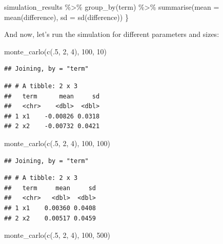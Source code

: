 \documentclass[
]{article}
\newenvironment{Shaded}{\begin{snugshade}}{\end{snugshade}}
\newcommand{\AttributeTok}[1]{\textcolor[rgb]{0.77,0.63,0.00}{#1}}
\newcommand{\DecValTok}[1]{\textcolor[rgb]{0.00,0.00,0.81}{#1}}
\newcommand{\FunctionTok}[1]{\textcolor[rgb]{0.00,0.00,0.00}{#1}}
\newcommand{\NormalTok}[1]{#1}
\newcommand{\SpecialCharTok}[1]{\textcolor[rgb]{0.00,0.00,0.00}{#1}}
\begin{document}
\begin{Shaded}
\begin{Highlighting}[]
\NormalTok{  simulation\_results }\SpecialCharTok{\%\textgreater{}\%} 
    \FunctionTok{group\_by}\NormalTok{(term) }\SpecialCharTok{\%\textgreater{}\%} 
    \FunctionTok{summarise}\NormalTok{(}\AttributeTok{mean =} \FunctionTok{mean}\NormalTok{(difference), }
              \AttributeTok{sd =} \FunctionTok{sd}\NormalTok{(difference))}
\NormalTok{\}}
\end{Highlighting}
\end{Shaded}

And now, let's run the simulation for different parameters and sizes:

\begin{Shaded}
\begin{Highlighting}[]
\FunctionTok{monte\_carlo}\NormalTok{(}\FunctionTok{c}\NormalTok{(.}\DecValTok{5}\NormalTok{, }\DecValTok{2}\NormalTok{, }\DecValTok{4}\NormalTok{), }\DecValTok{100}\NormalTok{, }\DecValTok{10}\NormalTok{)}
\end{Highlighting}
\end{Shaded}

\begin{verbatim}
## Joining, by = "term"
\end{verbatim}

\begin{verbatim}
## # A tibble: 2 x 3
##   term      mean     sd
##   <chr>    <dbl>  <dbl>
## 1 x1    -0.00826 0.0318
## 2 x2    -0.00732 0.0421
\end{verbatim}

\begin{Shaded}
\begin{Highlighting}[]
\FunctionTok{monte\_carlo}\NormalTok{(}\FunctionTok{c}\NormalTok{(.}\DecValTok{5}\NormalTok{, }\DecValTok{2}\NormalTok{, }\DecValTok{4}\NormalTok{), }\DecValTok{100}\NormalTok{, }\DecValTok{100}\NormalTok{)}
\end{Highlighting}
\end{Shaded}

\begin{verbatim}
## Joining, by = "term"
\end{verbatim}

\begin{verbatim}
## # A tibble: 2 x 3
##   term     mean     sd
##   <chr>   <dbl>  <dbl>
## 1 x1    0.00360 0.0408
## 2 x2    0.00517 0.0459
\end{verbatim}

\begin{Shaded}
\begin{Highlighting}[]
\FunctionTok{monte\_carlo}\NormalTok{(}\FunctionTok{c}\NormalTok{(.}\DecValTok{5}\NormalTok{, }\DecValTok{2}\NormalTok{, }\DecValTok{4}\NormalTok{), }\DecValTok{100}\NormalTok{, }\DecValTok{500}\NormalTok{)}
\end{Highlighting}
\end{Shaded}
\end{document}
